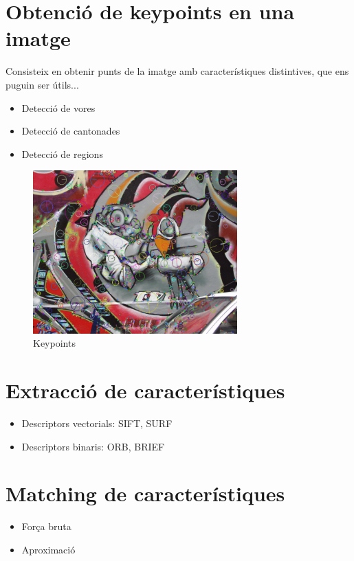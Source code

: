 \section{Obtenció de keypoints en una imatge}
	Consisteix en obtenir punts de la imatge amb característiques distintives, que ens puguin ser útils...
	\begin{itemize}	
		\item{Detecció de vores}
		\item{Detecció de cantonades}
		\item{Detecció de regions}
	\end{itemize}
	\begin{figure}[H]
		\centering
		\includegraphics[width=0.7\textwidth]{images/RobotKp}
		\caption{Keypoints}
	\end{figure}

\section{Extracció de característiques}
	
	\begin{itemize}	
		\item{Descriptors vectorials: SIFT, SURF}
		\item{Descriptors binaris: ORB, BRIEF}
	\end{itemize}


\section{Matching de característiques}

	\begin{itemize}	
		\item{Força bruta}
		\item{Aproximació}
	\end{itemize}

